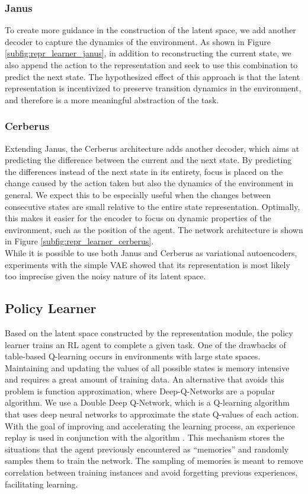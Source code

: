 \subsubsection{Janus}
To create more guidance in the construction of the latent space, we add another decoder to capture the dynamics of the environment. As shown in Figure \ref{subfig:repr_learner_janus}, in addition to reconstructing the current state, we also append the action to the representation and seek to use this combination to predict the next state.
The hypothesized effect of this approach is that the latent representation is incentivized to preserve transition dynamics in the environment, and therefore is a more meaningful abstraction of the task.

\subsubsection{Cerberus}
Extending Janus, the Cerberus architecture adds another decoder, which aims at predicting the difference between the current and the next state. By predicting the differences instead of the next state in its entirety, focus is placed on the change caused by the action taken but also the dynamics of the environment in general. We expect this to be especially useful when the changes between consecutive states are small relative to the entire state representation. Optimally, this makes it easier for the encoder to focus on dynamic properties of the environment, such as the position of the agent. The network architecture is shown in Figure \ref{subfig:repr_learner_cerberus}.\\

While it is possible to use both Janus and Cerberus as variational autoencoders, experiments with the simple VAE showed that its representation is most likely too imprecise given the noisy nature of its latent space.

\subsection{Policy Learner}
Based on the latent space constructed by the representation module, the policy learner trains an RL agent to complete a given task. One of the drawbacks of table-based Q-learning occurs in environments with large state spaces. Maintaining and updating the values of all possible states is memory intensive and requires a great amount of training data. An alternative that avoids this problem is function approximation, where Deep-Q-Networks are a popular algorithm. We use a Double Deep Q-Network, which is a Q-learning algorithm that uses deep neural networks to approximate the state Q-values of each action. With the goal of improving and accelerating the learning process, an experience replay is used in conjunction with the algorithm \citep{replay_memory_oc}. This mechanism stores the situations that the agent previously encountered as ``memories'' and randomly samples them to train the network. The sampling of memories is meant to remove correlation between training instances and avoid forgetting previous experiences, facilitating learning.

